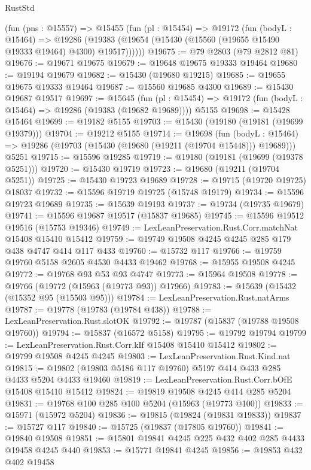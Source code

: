 \begin{lexlean}{RustStd}
\begin{coremodule}
{\begin{coremodule}
{{{{{{{{{{{{{{{{{{{{{{{{{{{{{{{{{{{{{{{{{{{{{{{{{{{{{{{{{{{{    (fun (pns : @15557) =>
    @15455
      (fun (pl : @15454) =>
      @19172
        (fun (bodyL : @15464) =>
        @19286 (@19383 (@19654 (@15430 (@15560 (@19655 @15490 @19333 @19464) @4300) @19517))))))
@19675 := @79 @2803 (@79 @2812 @81)
@19676 := @19671 @19675
@19679 := @19648 @19675 @19333 @19464
@19680 := @19194 @19679
@19682 := @15430 (@19680 @19215)
@19685 := @19655 @19675 @19333 @19464
@19687 := @15560 @19685 @4300
@19689 := @15430 @19687 @19517
@19697 := @15645
    (fun (pl : @15454) => @19172 (fun (bodyL : @15464) => @19286 (@19383 (@19682 @19689))))
    @5155
@19698 := @15428 @15464
@19699 := @19182 @5155
@19703 := @15430 (@19180 (@19181 (@19699 @19379)))
@19704 := @19212 @5155
@19714 := @19698
    (fun (bodyL : @15464) => @19286 (@19703 (@15430 (@19680 (@19211 (@19704 @15448))) @19689)))
    @5251
@19715 := @15596 @19285
@19719 := @19180 (@19181 (@19699 (@19378 @5251)))
@19720 := @15430 @19719
@19723 := @19680 (@19211 (@19704 @5251))
@19725 := @15430 @19723 @19689
@19728 := @19715 (@19720 @19725) @18037
@19732 := @15596 @19719 @19725 (@15748 @19179)
@19734 := @15596 @19723 @19689
@19735 := @15639 @19193
@19737 := @19734 (@19735 @19679)
@19741 := @15596 @19687 @19517 (@15837 @19685)
@19745 := @15596 @19512 @19516 (@15753 @19346)
@19749 := LexLeanPreservation.Rust.Corr.matchNat @15408 @15410 @15412
@19759 := @19749 @19508 @4245 @4245 @285 @179 @438 @4747 @414 @117 @433
@19760 := @15732 @117
@19766 := @19759 @19760 @5158 @2605 @4530 @4433 @19462
@19768 := @15955 @19508 @4245
@19772 := @19768 @93 @53 @93 @4747
@19773 := @15964 @19508
@19778 := @19766 (@19772 (@15963 (@19773 @93)) @17966)
@19783 := @15639 (@15432 (@15352 @95 (@15503 @95)))
@19784 := LexLeanPreservation.Rust.natArms
@19787 := @19778 (@19783 (@19784 @438))
@19788 := LexLeanPreservation.Rust.slotOK
@19792 := @19787 (@15837 (@19788 @19508 @19760))
@19794 := @15837 (@16572 @5158)
@19795 := @19792 @19794
@19799 := LexLeanPreservation.Rust.Corr.kIf @15408 @15410 @15412
@19802 := @19799 @19508 @4245 @4245
@19803 := LexLeanPreservation.Rust.Kind.nat
@19815 := @19802 (@19803 @5186 @117 @19760) @5197 @414 @433 @285 @4433 @5204 @4433 @19460
@19819 := LexLeanPreservation.Rust.Corr.bOfE @15408 @15410 @15412
@19824 := @19819 @19508 @4245 @414 @285 @5204
@19831 := @19768 @100 @285 @100 @5204 (@15963 (@19773 @100))
@19833 := @15971 (@15972 @5204)
@19836 := @19815 (@19824 (@19831 @19833))
@19837 := @15727 @117
@19840 := @15725 (@19837 (@17805 @19760))
@19841 := @19840 @19508
@19851 := @15801 @19841 @4245 @225 @432 @402 @285 @4433 @19458 @4245 @440
@19853 := @15771 @19841 @4245
@19856 := @19853 @432 @402 @19458
}}}}}}}}}}}}}}}}}}}}}}}}}}}}}}}}}}}}}}}}}}}}}}}}}}}}}}}}}}}}
\end{coremodule}}
\end{coremodule}
\end{lexlean}
